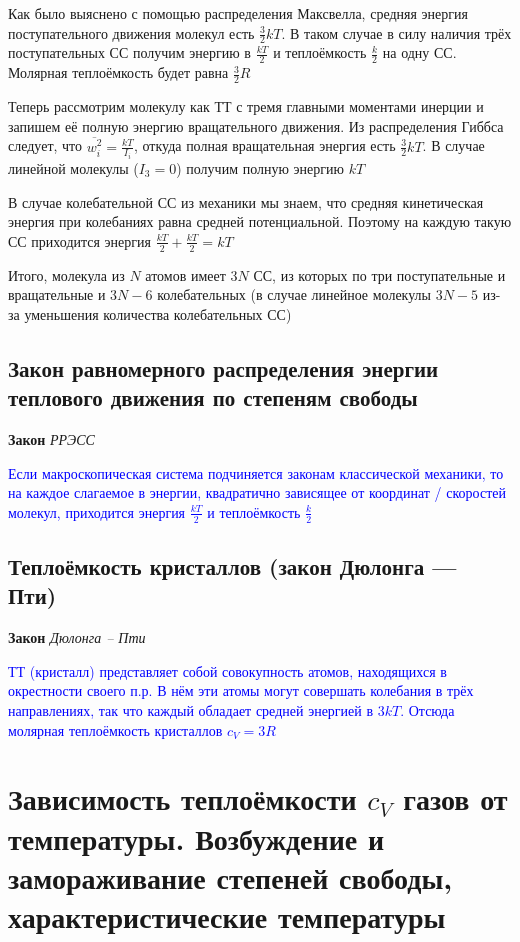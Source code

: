 \documentclass[a4paper, 14pt]{article}
\begin{document}
    Как было выяснено с помощью распределения Максвелла, средняя энергия поступательного движения молекул есть
    $\frac{3}{2} kT$.
    В таком случае в силу наличия трёх поступательных СС получим энергию в $\frac{kT}{2}$ и
    теплоёмкость $\frac{k}{2}$ на одну СС.
    Молярная теплоёмкость будет равна $\frac{3}{2}R$

    Теперь рассмотрим молекулу как ТТ с тремя главными моментами инерции и запишем её полную энергию вращательного
    движения.
    Из распределения Гиббса следует, что $\overline{w^2_i} = \frac{kT}{I_i}$, откуда полная вращательная энергия есть
    $\frac{3}{2} kT$.
    В случае линейной молекулы ($I_3 = 0$) получим полную энергию $kT$

    В случае колебательной СС из механики мы знаем, что средняя кинетическая энергия при колебаниях равна средней
    потенциальной.
    Поэтому на каждую такую СС приходится энергия $\frac{kT}{2} + \frac{kT}{2} = kT$

    Итого, молекула из $N$ атомов имеет $3N$ СС, из которых по три поступательные и вращательные и $3N - 6$
    колебательных (в случае линейное молекулы $3N - 5$ из-за уменьшения количества колебательных СС)

    \subsection{Закон равномерного распределения энергии теплового движения по степеням свободы}

    \textbf{Закон} \textit{РРЭСС}

    \textcolor{blue}{Если макроскопическая система подчиняется законам классической механики, то на каждое слагаемое
    в энергии, квадратично зависящее от координат / скоростей молекул, приходится энергия $\frac{kT}{2}$ и
    теплоёмкость $\frac{k}{2}$}

    \subsection{Теплоёмкость кристаллов (закон Дюлонга — Пти)}

    \textbf{Закон} \textit{Дюлонга -- Пти}

    \textcolor{blue}{ТТ (кристалл) представляет собой совокупность атомов, находящихся в окрестности своего п.р.
    В нём эти атомы могут совершать колебания в трёх направлениях, так что каждый обладает средней энергией в $3kT$.
    Отсюда молярная теплоёмкость кристаллов $c_V = 3R$}

    \section{Зависимость теплоёмкости $c_V$ газов от температуры.
    Возбуждение и замораживание степеней свободы, характеристические температуры}
\end{document}
